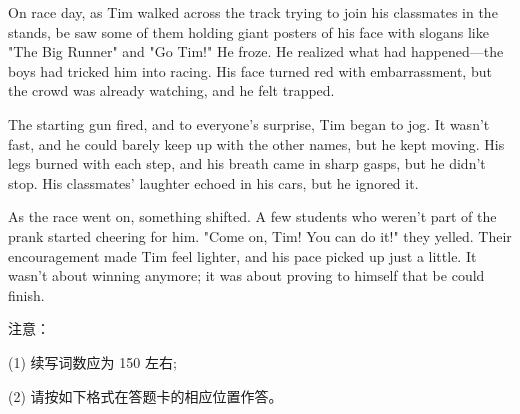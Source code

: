 \documentclass{英语试卷}
\begin{document}
\par On race day, as Tim walked across the track trying to join his classmates in the stands, be saw some of them holding giant posters of his face with slogans like "The Big Runner" and "Go Tim!" He froze. He realized what had happened—the boys had tricked him into racing. His face turned red with embarrassment, but the crowd was already watching, and he felt trapped.\par
\par The starting gun fired, and to everyone's surprise, Tim began to jog. It wasn't fast, and he could barely keep up with the other names, but he kept moving. His legs burned with each step, and his breath came in sharp gasps, but he didn't stop. His classmates' laughter echoed in his cars, but he ignored it.\par
\par As the race went on, something shifted. A few students who weren't part of the prank started cheering for him. "Come on, Tim! You can do it!" they yelled. Their encouragement made Tim feel lighter, and his pace picked up just a little. It wasn't about winning anymore; it was about proving to himself that be could finish.\par
\par 注意：\par
\par (1) 续写词数应为 150 左右;\par
\par (2) 请按如下格式在答题卡的相应位置作答。\par
{}
\end{document}
